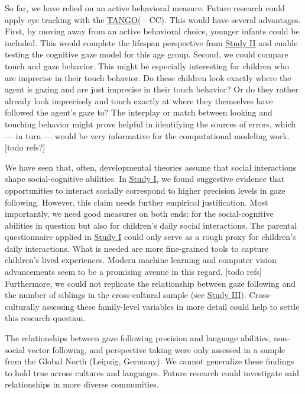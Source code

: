 \documentclass[
]{scrbook}
\begin{document}
So far, we have relied on an active behavioral measure. Future research could apply eye tracking with the \hyperref[acronyms_TANGO]{TANGO}(---CC). This would have several advantages. First, by moving away from an active behavioral choice, younger infants could be included. This would complete the lifespan perspective from \hyperref[studyII]{Study II} and enable testing the cognitive gaze model for this age group. Second, we could compare touch and gaze behavior. This might be especially interesting for children who are imprecise in their touch behavior. Do these children look exactly where the agent is gazing and are just imprecise in their touch behavior? Or do they rather already look imprecisely and touch exactly at where they themselves have followed the agent's gaze to? The interplay or match between looking and touching behavior might prove helpful in identifying the sources of errors, which --- in turn --- would be very informative for the computational modeling work. {[}todo refs?{]}

We have seen that, often, developmental theories assume that social interactions shape social-cognitive abilities. In \hyperref[studyI]{Study I}, we found suggestive evidence that opportunities to interact socially correspond to higher precision levels in gaze following. However, this claim needs further empirical justification. Most importantly, we need good measures on both ends: for the social-cognitive abilities in question but also for children's daily social interactions. The parental questionnaire applied in \hyperref[studyI]{Study I} could only serve as a rough proxy for children's daily interactions. What is needed are more fine-grained tools to capture children's lived experiences. Modern machine learning and computer vision advancements seem to be a promising avenue in this regard. {[}todo refs{]} Furthermore, we could not replicate the relationship between gaze following and the number of siblings in the cross-cultural sample (see \hyperref[studyIII]{Study III}). Cross-culturally assessing these family-level variables in more detail could help to settle this research question.

The relationships between gaze following precision and language abilities, non-social vector following, and perspective taking were only assessed in a sample from the Global North (Leipzig, Germany). We cannot generalize these findings to hold true across cultures and languages. Future research could investigate said relationships in more diverse communities.
\end{document}
